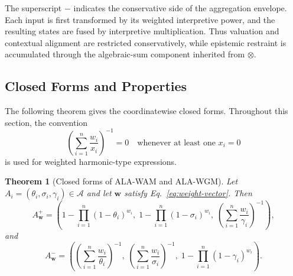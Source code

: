 \documentclass[reqno,final]{amsart}
\theoremstyle{definition}
\theoremstyle{plain}
\newtheorem{theorem}{Theorem}
\theoremstyle{remark}
\providecommand{\cA}{\mathcal{A}}
\begin{document}
The superscript \(-\) indicates the conservative side of the aggregation envelope. Each input is first transformed by its weighted interpretive power, and the resulting states are fused by interpretive multiplication. Thus valuation and contextual alignment are restricted conservatively, while epistemic restraint is accumulated through the algebraic-sum component inherited from \(\otimes\).

\subsection{Closed Forms and Properties}
\label{subsec:aggregation-closed-forms}

The following theorem gives the coordinatewise closed forms. Throughout this section, the convention
\begin{equation}
\left(\sum_{i=1}^{n}\frac{w_i}{x_i}\right)^{-1}=0
\quad\text{whenever at least one }x_i=0
\label{eq:harmonic-convention}
\end{equation}
is used for weighted harmonic-type expressions.

\begin{theorem}[Closed forms of ALA-WAM and ALA-WGM]
\label{thm:closed-forms-wam-wgm}
Let \(A_i=(\theta_i,\sigma_i,\gamma_i)\in\cA\) and let \(\mathbf{w}\) satisfy Eq.~\eqref{eq:weight-vector}. Then
\begin{equation}
A_{\mathbf{w}}^{+}
=
\left(
1-\prod_{i=1}^{n}(1-\theta_i)^{w_i},
\;1-\prod_{i=1}^{n}(1-\sigma_i)^{w_i},
\;\left(\sum_{i=1}^{n}\frac{w_i}{\gamma_i}\right)^{-1}
\right),
\label{eq:closed-wam}
\end{equation}
and
\begin{equation}
A_{\mathbf{w}}^{-}
=
\left(
\left(\sum_{i=1}^{n}\frac{w_i}{\theta_i}\right)^{-1},
\;\left(\sum_{i=1}^{n}\frac{w_i}{\sigma_i}\right)^{-1},
\;1-\prod_{i=1}^{n}(1-\gamma_i)^{w_i}
\right).
\label{eq:closed-wgm}
\end{equation}
\end{theorem}
\end{document}
